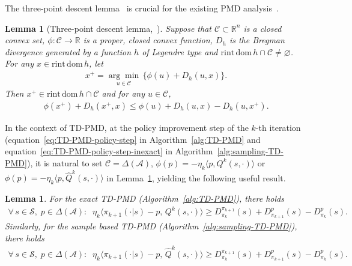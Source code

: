 \documentclass[10pt]{article}
\newcommand{\calA}{\mathcal{A}}
\newcommand{\calS}{\mathcal{S}}
\theoremstyle{plain}
\newtheorem{lemma}[theorem]{Lemma}
\theoremstyle{definition}
\begin{document}
The three-point descent lemma~\cite{chen1993convergence} is crucial for the existing PMD analysis~\cite{Xiao_2022,Lan_2021,yuan2023general,Johnson_Pike-Burke_Rebeschini_2023}. %

\begin{lemma}[Three-point descent lemma,~\cite{Xiao_2022,chen1993convergence}]
    Suppose that $\mathcal{C} \subset \mathbb{R}^n$ is a closed convex set, $\phi: \mathcal{C} \to \mathbb{R}$ is a proper, closed convex function, $D_h$ is the Bregman divergence generated by a function $h$ of Legendre type and $\mathrm{rint} \, \mathrm{dom}\, h \cap  \mathcal{C} \neq \varnothing$. For any $x\in\mathrm{rint}\,\mathrm{dom}\,h$, let
    \begin{align*}
        x^+ = \underset{u\in\mathcal{C}}{\arg\min} \, \{ \phi(u) + D_h(u,x) \}.
    \end{align*}
    Then $x^+ \in \mathrm{rint}\, \mathrm{dom}\, h\cap \mathcal{C}$ and for any $u\in\mathcal{C}$,
    \begin{align*}
        \phi(x^+) + D_h(x^+, x) \leq \phi(u) + D_h(u,x) - D_h(u, x^+).
    \end{align*}    
    \label{lem:original-three-point}
\end{lemma}

In the context of TD-PMD, at the policy improvement step of the $k$-th iteration (equation~\eqref{eq:TD-PMD-policy-step} in Algorithm~\ref{alg:TD-PMD} and equation~\eqref{eq:TD-PMD-policy-step-inexact} in Algorithm~\ref{alg:sampling-TD-PMD}), it is natural to set $\mathcal{C}=\Delta(\calA)$, $\phi(p) = -\eta_k\langle p, Q^k(s,\cdot) \rangle$ or $\phi(p) = -\eta_k\langle p, \widehat{Q}^k(s,\cdot)\rangle$ in Lemma~\ref{lem:original-three-point}, yielding the following useful result.

\begin{lemma}
   For the exact TD-PMD (Algorithm~\ref{alg:TD-PMD}), there holds
    \begin{align*}
        \forall\, s\in\calS,\; p\in\Delta(\calA): \;\; \eta_k \langle \pi_{k+1}(\cdot|s) - p, \, Q^k(s,\cdot) \rangle \geq D^{\pi_{k+1}}_{\pi_k}(s) + D^p_{\pi_{k+1}}(s) - D^p_{\pi_k}(s).
    \end{align*}
    Similarly, for the sample based TD-PMD (Algorithm~\ref{alg:sampling-TD-PMD}),  there holds
    \begin{align*}
        \forall\, s\in\calS,\; p\in\Delta(\calA): \;\; \eta_k \langle \pi_{k+1}(\cdot|s) - p, \, \widehat{Q}^k(s,\cdot) \rangle \geq D^{\pi_{k+1}}_{\pi_k}(s) + D^p_{\pi_{k+1}}(s) - D^p_{\pi_k}(s).
    \end{align*}
    \label{lem:TD-PMD-three-point-original}
\end{lemma}
\end{document}
